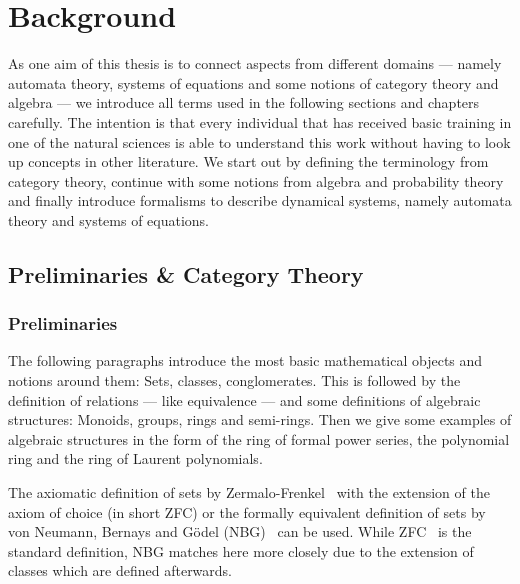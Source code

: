 \chapter{Background}\label{\positionnumber} 
    As one aim of this thesis is to connect aspects from different domains --- namely automata theory, systems of equations and some notions of category theory and algebra --- we introduce all terms used in the following sections and chapters carefully. The intention is that every individual that has received basic training in one of the natural sciences is able to understand this work without having to look up concepts in other literature.
    We start out by defining the terminology from category theory, continue with some notions from algebra and probability theory and finally introduce formalisms to describe dynamical systems, namely automata theory and systems of equations.
    
    \section{Preliminaries \& Category Theory}
        \subsection{Preliminaries}
            The following paragraphs introduce the most basic mathematical objects and notions around them: Sets, classes, conglomerates. This is followed by the definition of relations --- like equivalence --- and some definitions of algebraic structures: Monoids, groups, rings and semi-rings.
            Then we give some examples of algebraic structures in the form of the ring of formal power series, the polynomial ring and the ring of Laurent polynomials.
        
        
            The axiomatic definition of sets by Zermalo-Frenkel~\autocite{ZF} with the extension of the axiom of choice (in short ZFC) or the formally equivalent definition of sets by von Neumann, Bernays and Gödel (NBG)~\autocite{NBG} can be used. While ZFC~\autocite{ZFC} is the standard definition, NBG matches here more closely due to the extension of classes which are defined afterwards. \\
                
